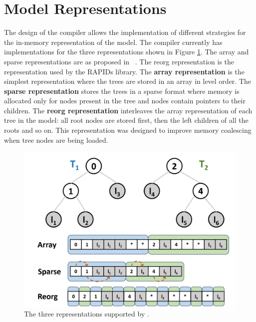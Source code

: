 \section{Model Representations}
\label{sec:representations}

The design of the \Treebeard{} compiler allows the implementation of different strategies for 
the in-memory representation of the model. The compiler currently has implementations for 
the three representations shown in Figure \ref{Fig:Representations}. The array and sparse 
representations are as proposed in \TreebeardOLD{}~\cite{Treebeard}. The reorg 
representation is the representation used by the RAPIDs library\cite{FIL}. 
The \textbf{array representation} is the simplest representation where the trees are stored in an array
in level order. The \textbf{sparse representation} stores the trees in a sparse format where 
memory is allocated only for nodes present in the tree and nodes contain pointers to their children. The \textbf{reorg representation}
interleaves the array representation of each tree in the model: all root nodes are stored first, then 
the left children of all the roots and so on. This representation was 
designed to improve memory coalescing when tree nodes are being loaded. 
\begin{figure}[htb]
  \centering
  \includegraphics[width=0.7\linewidth]{figures/representations.png}
  \caption{The three representations supported by \Treebeard{}.}
  \label{Fig:Representations}
\end{figure}

